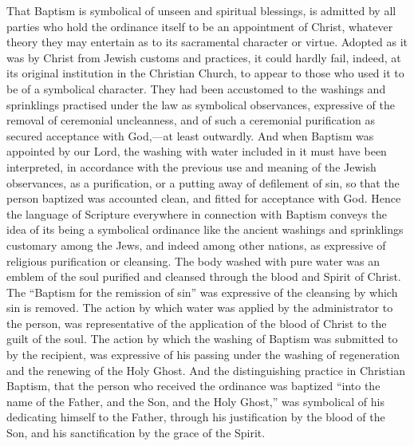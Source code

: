 \documentclass[
]{book}
\begin{document}
That Baptism is symbolical of unseen and spiritual blessings, is admitted by all parties who hold the ordinance itself to be an appointment of Christ, whatever theory they may entertain as to its sacramental character or virtue. Adopted as it was by Christ from Jewish customs and practices, it could hardly fail, indeed, at its original institution in the Christian Church, to appear to those who used it to be of a symbolical character. They had been accustomed to the washings and sprinklings practised under the law as symbolical observances, expressive of the removal of ceremonial uncleanness, and of such a ceremonial purification as secured acceptance with God,---at least outwardly. And when Baptism was appointed by our Lord, the washing with water included in it must have been interpreted, in accordance with the previous use and meaning of the Jewish observances, as a purification, or a putting away of defilement of sin, so that the person baptized was accounted clean, and fitted for acceptance with God. Hence the language of Scripture everywhere in connection with Baptism conveys the idea of its being a symbolical ordinance like the ancient washings and sprinklings customary among the Jews, and indeed among other nations, as expressive of religious purification or cleansing. The body washed with pure water was an emblem of the soul purified and cleansed through the blood and Spirit of Christ. The ``Baptism for the remission of sin'' was expressive of the cleansing by which sin is removed. The action by which water was applied by the administrator to the person, was representative of the application of the blood of Christ to the guilt of the soul. The action by which the washing of Baptism was submitted to by the recipient, was expressive of his passing under the washing of regeneration and the renewing of the Holy Ghost. And the distinguishing practice in Christian Baptism, that the person who received the ordinance was baptized ``into the name of the Father, and the Son, and the Holy Ghost,'' was symbolical of his dedicating himself to the Father, through his justification by the blood of the Son, and his sanctification by the grace of the Spirit.
\end{document}
